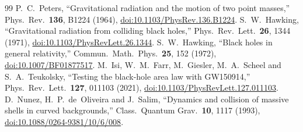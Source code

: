 \documentclass[11pt,a4paper]{article}
\begin{document}
\begin{thebibliography}{99}
 P.~C.~Peters, ``Gravitational radiation and the motion of two point masses,'' Phys.\ Rev.\ \textbf{136}, B1224 (1964), \href{https://doi.org/10.1103/PhysRev.136.B1224}{doi:10.1103/PhysRev.136.B1224}.
 S.~W.~Hawking, ``Gravitational radiation from colliding black holes,'' Phys.\ Rev.\ Lett.\ \textbf{26}, 1344 (1971), \href{https://doi.org/10.1103/PhysRevLett.26.1344}{doi:10.1103/PhysRevLett.26.1344}.
 S.~W.~Hawking, ``Black holes in general relativity,'' Commun.\ Math.\ Phys.\ \textbf{25}, 152 (1972), \href{https://doi.org/10.1007/BF01877517}{doi:10.1007/BF01877517}.
 M.~Isi, W.~M.~Farr, M.~Giesler, M.~A.~Scheel and S.~A.~Teukolsky, ``Testing the black-hole area law with GW150914,'' Phys.\ Rev.\ Lett.\ \textbf{127}, 011103 (2021), \href{https://doi.org/10.1103/PhysRevLett.127.011103}{doi:10.1103/PhysRevLett.127.011103}.
 D.~Nunez, H.~P.~de~Oliveira and J.~Salim, ``Dynamics and collision of massive shells in curved backgrounds,'' Class.\ Quantum Grav.\ \textbf{10}, 1117 (1993), \href{https://doi.org/10.1088/0264-9381/10/6/008}{doi:10.1088/0264-9381/10/6/008}.
\end{thebibliography}
\end{document}
